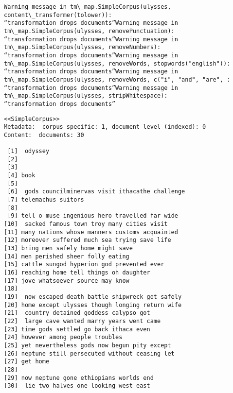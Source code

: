\documentclass[11pt]{article}
\begin{document}
    \begin{Verbatim}[commandchars=\\\{\}]
Warning message in tm\_map.SimpleCorpus(ulysses, content\_transformer(tolower)):
“transformation drops documents”Warning message in tm\_map.SimpleCorpus(ulysses, removePunctuation):
“transformation drops documents”Warning message in tm\_map.SimpleCorpus(ulysses, removeNumbers):
“transformation drops documents”Warning message in tm\_map.SimpleCorpus(ulysses, removeWords, stopwords("english")):
“transformation drops documents”Warning message in tm\_map.SimpleCorpus(ulysses, removeWords, c("i", "and", "are", :
“transformation drops documents”Warning message in tm\_map.SimpleCorpus(ulysses, stripWhitespace):
“transformation drops documents”
    \end{Verbatim}

    \begin{Verbatim}[commandchars=\\\{\}]
<<SimpleCorpus>>
Metadata:  corpus specific: 1, document level (indexed): 0
Content:  documents: 30

 [1]  odyssey                                        
 [2]                                                 
 [3]                                                 
 [4] book                                            
 [5]                                                 
 [6]  gods councilminervas visit ithacathe challenge 
 [7] telemachus suitors                              
 [8]                                                 
 [9] tell o muse ingenious hero travelled far wide   
[10]  sacked famous town troy many cities visit      
[11] many nations whose manners customs acquainted   
[12] moreover suffered much sea trying save life     
[13] bring men safely home might save                
[14] men perished sheer folly eating                 
[15] cattle sungod hyperion god prevented ever       
[16] reaching home tell things oh daughter           
[17] jove whatsoever source may know                 
[18]                                                 
[19]  now escaped death battle shipwreck got safely  
[20] home except ulysses though longing return wife  
[21]  country detained goddess calypso got           
[22]  large cave wanted marry years went came        
[23] time gods settled go back ithaca even           
[24] however among people troubles                   
[25] yet nevertheless gods now begun pity except     
[26] neptune still persecuted without ceasing let    
[27] get home                                        
[28]                                                 
[29] now neptune gone ethiopians worlds end          
[30]  lie two halves one looking west east           

    \end{Verbatim}
\end{document}
